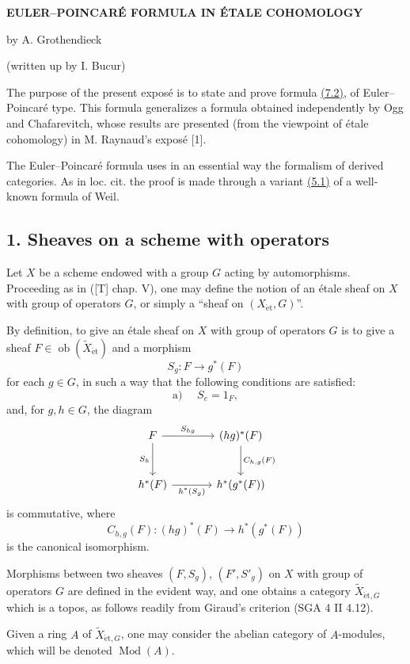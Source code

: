 \documentclass[11pt]{article}
\providecommand{\et}{\mathrm{\acute{e}t}}
\providecommand{\Ob}{\operatorname{ob}}
\providecommand{\Ob}{\operatorname{ob}}
\providecommand{\Ob}{\operatorname{Ob}}
\providecommand{\Mod}{\operatorname{Mod}}
\providecommand{\Ob}{\operatorname{ob}}
\providecommand{\Ob}{\operatorname{Ob}}
\providecommand{\et}{\acute{e}t}
\begin{document}
\begin{center}
\textbf{EULER--POINCARÉ FORMULA IN ÉTALE COHOMOLOGY}

by A. Grothendieck

(written up by I. Bucur)
\end{center}

The purpose of the present exposé is to state and prove formula \hyperref[sga5:X:equation:7.2]{(7.2)}, of Euler--Poincaré type. This formula generalizes a formula obtained independently by Ogg and Chafarevitch, whose results are presented (from the viewpoint of étale cohomology) in M. Raynaud's exposé [1].

The Euler--Poincaré formula uses in an essential way the formalism of derived categories. As in loc. cit. the proof is made through a variant \hyperref[sga5:X:proposition:5.1]{(5.1)} of a well-known formula of Weil.

\subsection*{1. Sheaves on a scheme with operators}\label{sga5:X:subsection:1}

Let $X$ be a scheme endowed with a group $G$ acting by automorphisms. Proceeding as in ([T] chap. V), one may define the notion of an étale sheaf on $X$ with group of operators $G$, or simply a “sheaf on $(X_{\et},G)$”.

By definition, to give an étale sheaf on $X$ with group of operators $G$ is to give a sheaf $F\in \Ob(\widetilde X_{\et})$ and a morphism
\[
S_g:F\longrightarrow g^*(F)
\]
for each $g\in G$, in such a way that the following conditions are satisfied:
\[
\text{a) }\quad S_e=1_F,
\]
and, for $g,h\in G$, the diagram
\[
\begin{tikzcd}[column sep=large,row sep=large]
F \arrow[r,"S_{hg}"] \arrow[d,"S_h"'] & (hg)^*(F) \arrow[d,"C_{h,g}(F)"]\\
h^*(F) \arrow[r,"h^*(S_g)"'] & h^*(g^*(F))
\end{tikzcd}
\]
is commutative, where
\[
C_{h,g}(F):(hg)^*(F)\longrightarrow h^*(g^*(F))
\]
is the canonical isomorphism.

Morphisms between two sheaves $(F,S_g)$, $(F',S'_g)$ on $X$ with group of operators $G$ are defined in the evident way, and one obtains a category $\widetilde X_{\et,G}$ which is a topos, as follows readily from Giraud's criterion (SGA 4 II 4.12).

Given a ring $A$ of $\widetilde X_{\et,G}$, one may consider the abelian category of $A$-modules, which will be denoted $\Mod(A)$.
\end{document}
